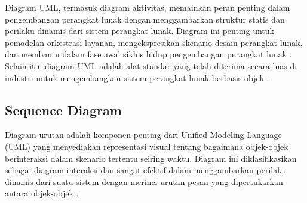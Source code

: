 Diagram UML, termasuk diagram aktivitas, memainkan peran penting dalam pengembangan perangkat lunak dengan menggambarkan struktur statis dan perilaku dinamis dari sistem perangkat lunak. Diagram ini penting untuk pemodelan orkestrasi layanan, mengekspresikan skenario desain perangkat lunak, dan membantu dalam fase awal siklus hidup pengembangan perangkat lunak \citep{modi2021tool,flores2022empirical}. Selain itu, diagram UML adalah alat standar yang telah diterima secara luas di industri untuk mengembangkan sistem perangkat lunak berbasis objek \citep{weriza2022development}.

\subsection{Sequence Diagram}
Diagram urutan adalah komponen penting dari Unified Modeling Language (UML) yang menyediakan representasi visual tentang bagaimana objek-objek berinteraksi dalam skenario tertentu seiring waktu. Diagram ini diklasifikasikan sebagai diagram interaksi dan sangat efektif dalam menggambarkan perilaku dinamis dari suatu sistem dengan merinci urutan pesan yang dipertukarkan antara objek-objek \citep{huzar2005uml}.

